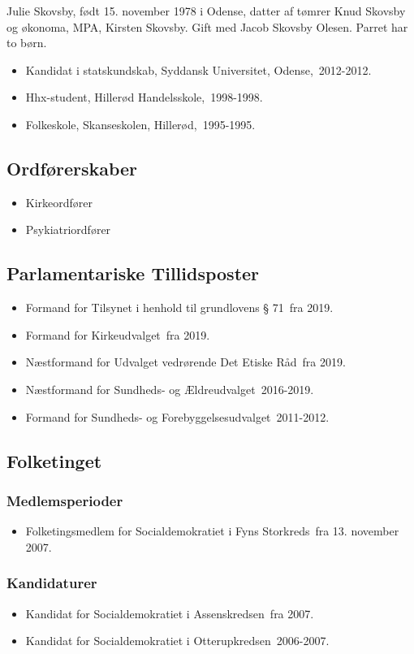 \documentclass[11pt, a4paper]{awesome-cv}
\begin{document}
\makecvheader[R]
\makelettertitle
\begin{cvletter}
Julie Skovsby, født 15. november 1978 i Odense, datter af tømrer Knud Skovsby og økonoma, MPA, Kirsten Skovsby. Gift med Jacob Skovsby Olesen. Parret har to børn.

\begin{itemize}
\item Kandidat i statskundskab, Syddansk Universitet, Odense, 2012-2012.
\item Hhx-student, Hillerød Handelsskole, 1998-1998.
\item Folkeskole, Skanseskolen, Hillerød, 1995-1995.
\end{itemize}
\subsection*{Ordførerskaber}
\begin{itemize}
\item Kirkeordfører
\item Psykiatriordfører
\end{itemize}
\subsection*{Parlamentariske Tillidsposter}
\begin{itemize}
\item Formand for Tilsynet i henhold til grundlovens § 71 fra 2019.
\item Formand for Kirkeudvalget fra 2019.
\item Næstformand for Udvalget vedrørende Det Etiske Råd fra 2019.
\item Næstformand for Sundheds- og Ældreudvalget 2016-2019.
\item Formand for Sundheds- og Forebyggelsesudvalget 2011-2012.
\end{itemize}
\subsection*{Folketinget}
\subsubsection*{Medlemsperioder}
\begin{itemize}
\item Folketingsmedlem for Socialdemokratiet i Fyns Storkreds fra 13. november 2007.
\end{itemize}
\subsubsection*{Kandidaturer}
\begin{itemize}
\item Kandidat for Socialdemokratiet i Assenskredsen fra 2007.
\item Kandidat for Socialdemokratiet i Otterupkredsen 2006-2007.
\end{itemize}
\end{cvletter}
\end{document}
